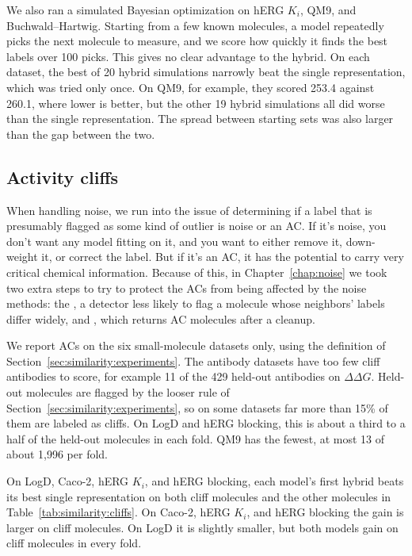 We also ran a simulated Bayesian optimization on hERG $K_i$, QM9, and Buchwald--Hartwig. Starting from a few known molecules, a model repeatedly picks the next molecule to measure, and we score how quickly it finds the best labels over 100 picks. This gives no clear advantage to the hybrid. On each dataset, the best of 20 hybrid simulations narrowly beat the single representation, which was tried only once. On QM9, for example, they scored 253.4 against 260.1, where lower is better, but the other 19 hybrid simulations all did worse than the single representation. The spread between starting sets was also larger than the gap between the two.

\subsection{Activity cliffs}\label{sec:similarity:results_cliffs}

When handling noise, we run into the issue of determining if a label that is presumably flagged as some kind of outlier is noise or an AC. If it's noise, you don't want any model fitting on it, and you want to either remove it, down-weight it, or correct the label. But if it's an AC, it has the potential to carry very critical chemical information. Because of this, in Chapter~\ref{chap:noise} we took two extra steps to try to protect the ACs from being affected by the noise methods: the , a detector less likely to flag a molecule whose neighbors' labels differ widely, and , which returns AC molecules after a cleanup.

We report ACs on the six small-molecule datasets only, using the definition of Section~\ref{sec:similarity:experiments}. The antibody datasets have too few cliff antibodies to score, for example 11 of the 429 held-out antibodies on $\Delta\Delta G$. Held-out molecules are flagged by the looser rule of Section~\ref{sec:similarity:experiments}, so on some datasets far more than 15\% of them are labeled as cliffs. On LogD and hERG blocking, this is about a third to a half of the held-out molecules in each fold. QM9 has the fewest, at most 13 of about 1,996 per fold.

On LogD, Caco-2, hERG $K_i$, and hERG blocking, each model's first hybrid beats its best single representation on both cliff molecules and the other molecules in Table~\ref{tab:similarity:cliffs}. On Caco-2, hERG $K_i$, and hERG blocking the gain is larger on cliff molecules. On LogD it is slightly smaller, but both models gain on cliff molecules in every fold.

